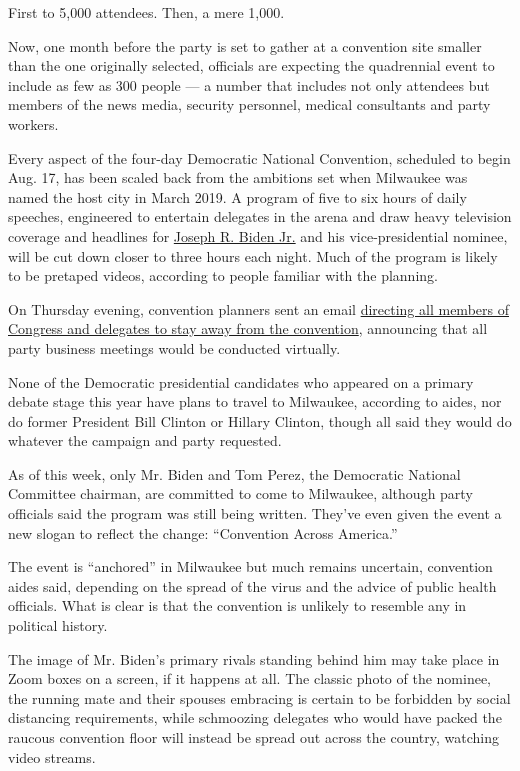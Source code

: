 First to 5,000 attendees. Then, a mere 1,000.

Now, one month before the party is set to gather at a convention site
smaller than the one originally selected, officials are expecting the
quadrennial event to include as few as 300 people --- a number that
includes not only attendees but members of the news media, security
personnel, medical consultants and party workers.

Every aspect of the four-day Democratic National Convention, scheduled
to begin Aug. 17, has been scaled back from the ambitions set when
Milwaukee was named the host city in March 2019. A program of five to
six hours of daily speeches, engineered to entertain delegates in the
arena and draw heavy television coverage and headlines for
\href{https://www.nytimes3xbfgragh.onion/interactive/2020/us/elections/joe-biden.html}{Joseph
R. Biden Jr.} and his vice-presidential nominee, will be cut down closer
to three hours each night. Much of the program is likely to be pretaped
videos, according to people familiar with the planning.

On Thursday evening, convention planners sent an email
\href{https://www.nytimes3xbfgragh.onion/2020/07/16/us/politics/democratic-convention-milwaukee.html?action=click\&module=Top\%20Stories\&pgtype=Homepage}{directing
all members of Congress and delegates to stay away from the convention},
announcing that all party business meetings would be conducted
virtually.

None of the Democratic presidential candidates who appeared on a primary
debate stage this year have plans to travel to Milwaukee, according to
aides, nor do former President Bill Clinton or Hillary Clinton, though
all said they would do whatever the campaign and party requested.

As of this week, only Mr. Biden and Tom Perez, the Democratic National
Committee chairman, are committed to come to Milwaukee, although party
officials said the program was still being written. They've even given
the event a new slogan to reflect the change: ``Convention Across
America.''

The event is ``anchored'' in Milwaukee but much remains uncertain,
convention aides said, depending on the spread of the virus and the
advice of public health officials. What is clear is that the convention
is unlikely to resemble any in political history.

The image of Mr. Biden's primary rivals standing behind him may take
place in Zoom boxes on a screen, if it happens at all. The classic photo
of the nominee, the running mate and their spouses embracing is certain
to be forbidden by social distancing requirements, while schmoozing
delegates who would have packed the raucous convention floor will
instead be spread out across the country, watching video streams.

